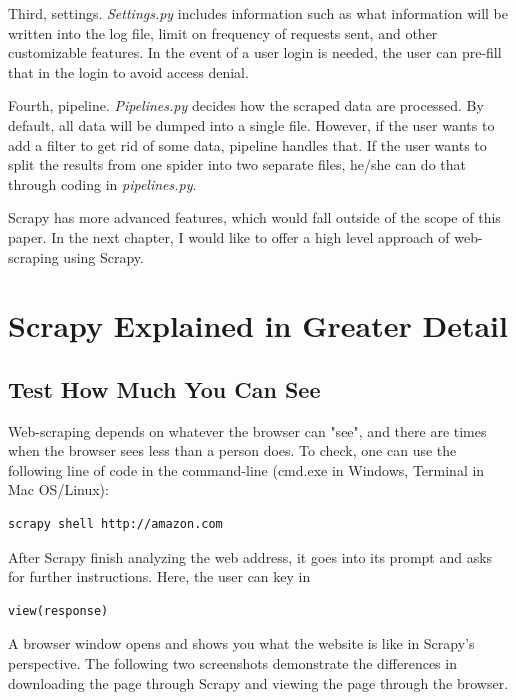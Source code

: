 \documentclass[12pt]{report}
\begin{document}
Third, settings. \textit{Settings.py} includes information such as what information will be written into the log file, limit on frequency of requests sent, and other customizable features. In the event of a user login is needed, the user can pre-fill that in the login to avoid access denial.

Fourth, pipeline. \textit{Pipelines.py} decides how the scraped data are processed. By default, all data will be dumped into a single file. However, if the user wants to add a filter to get rid of some data, pipeline handles that. If the user wants to split the results from one spider into two separate files, he/she can do that through coding in \textit{pipelines.py}.

Scrapy has more advanced features, which would fall outside of the scope of this paper. In the next chapter, I would like to offer a high level approach of web-scraping using Scrapy.

\chapter{Scrapy Explained in Greater Detail}

\section{Test How Much You Can See}
Web-scraping depends on whatever the browser can "see", and there are times when the browser sees less than a person does. To check, one can use the following line of code in the command-line (cmd.exe in Windows, Terminal in Mac OS/Linux): 
\begin{lstlisting}
scrapy shell http://amazon.com
\end{lstlisting}
After Scrapy finish analyzing the web address, it goes into its prompt and asks for further instructions. Here, the user can key in 
\begin{lstlisting}
view(response)
\end{lstlisting} 
A browser window opens and shows you what the website is like in Scrapy's perspective. The following two screenshots demonstrate the differences in downloading the page through Scrapy and viewing the page through the browser. 
\end{document}
